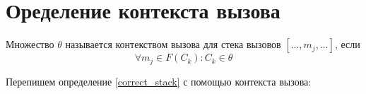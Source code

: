 \documentclass[graybox]{svmult}
\begin{document}
\section{Оределение контекста вызова}
\label{sec:2}
\begin{definition}
\label{context}
Множество $\theta$ называется контекством вызова для стека вызовов $[\dots, m_j, \dots]$, если 
\begin{equation}
\forall m_j \in F(C_k): C_k \in \theta
\end{equation}
\end{definition}

Перепишем определение \ref{correct_stack} с помощью контекста вызова:
\end{document}
